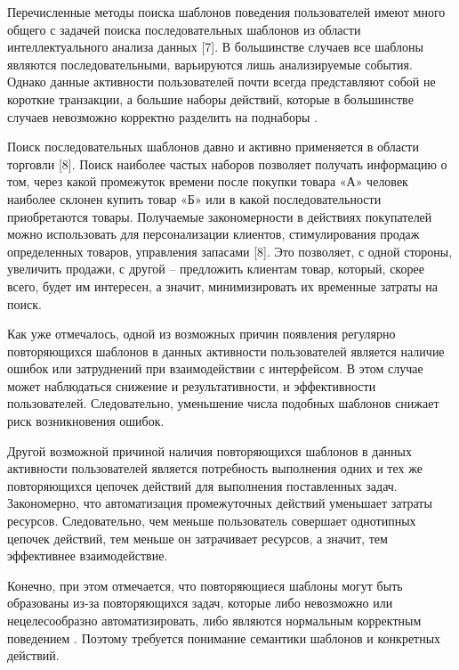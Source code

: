 Перечисленные методы поиска шаблонов поведения пользователей имеют много общего с задачей поиска последовательных шаблонов из области интеллектуального анализа данных [7]. В большинстве случаев все шаблоны являются последовательными, варьируются лишь анализируемые события. Однако данные активности пользователей почти всегда представляют собой не короткие транзакции, а большие наборы действий, которые в большинстве случаев невозможно корректно разделить на поднаборы \cite{2,3}.

Поиск последовательных шаблонов давно и активно применяется в области торговли [8]. Поиск наиболее частых наборов позволяет получать
информацию о том, через какой промежуток времени после покупки товара «А» человек наиболее склонен купить товар «Б» или в какой последовательности приобретаются товары. Получаемые закономерности в действиях покупателей можно использовать для персонализации клиентов, стимулирования продаж определенных товаров, управления запасами [8]. Это позволяет, с одной стороны, увеличить продажи, с другой – предложить клиентам товар, который, скорее всего, будет им интересен, а значит, минимизировать их временные затраты на поиск.


Как уже отмечалось, одной из возможных причин появления регулярно повторяющихся шаблонов в данных активности пользователей является
наличие ошибок или затруднений при взаимодействии с интерфейсом. В этом случае может наблюдаться снижение и результативности, и эффективности пользователей. Следовательно, уменьшение числа подобных шаблонов снижает риск возникновения ошибок.

Другой возможной причиной наличия повторяющихся шаблонов в данных активности пользователей является потребность выполнения одних и
тех же повторяющихся цепочек действий для выполнения поставленных задач. Закономерно, что автоматизация промежуточных действий уменьшает затраты ресурсов. Следовательно, чем меньше пользователь совершает однотипных цепочек действий, тем меньше он затрачивает ресурсов, а значит, тем эффективнее взаимодействие.

Конечно, при этом отмечается, что повторяющиеся шаблоны могут быть образованы из-за повторяющихся задач, которые либо невозможно или
нецелесообразно автоматизировать, либо являются нормальным корректным поведением \cite{1}. Поэтому требуется понимание семантики шаблонов и конкретных действий.

